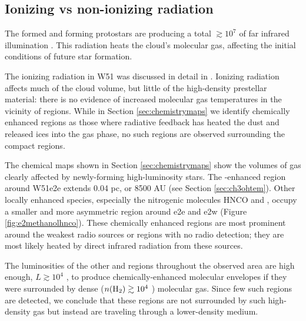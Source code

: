 \documentclass{emulateapj}
\begin{document}
\subsection{Ionizing vs non-ionizing radiation}
\label{sec:nonionizingradiation}
The formed and forming protostars are producing a total $\gtrsim10^7$ \lsun of
far infrared illumination \citep{Ginsburg2016b}.  This radiation heats the
cloud's molecular gas, affecting the initial conditions of future star
formation.

The ionizing radiation in W51 was discussed in detail in \citet{Ginsburg2016b}.
Ionizing radiation affects much of the cloud volume, but little of the
high-density prestellar material:  there is no evidence of increased molecular gas
temperatures in the vicinity of \hii regions.  While in Section
\ref{sec:chemistrymaps} we identify chemically enhanced regions as those where
radiative feedback has heated the dust and released ices into the gas phase, no
such regions are observed surrounding the compact \hii regions.


The chemical maps shown in Section \ref{sec:chemistrymaps} show the volumes of
gas clearly affected by newly-forming high-luminosity stars.  The
\methanol-enhanced region around W51e2e extends 0.04 pc, or 8500 AU (see Section
\ref{sec:ch3ohtem}). Other locally enhanced species, especially the nitrogenic
molecules HNCO and \formamide, occupy a smaller and more asymmetric region
around e2e and e2w (Figure \ref{fig:e2methanolhnco}).  These chemically enhanced
regions are most prominent around the weakest radio sources or regions with
no radio detection; they are most likely heated by direct infrared radiation
from these sources.

The luminosities of the other \uchii and \hchii regions throughout the observed
area are high enough, $L\gtrsim10^4$ \lsun, to produce chemically-enhanced
molecular envelopes if they were surrounded by dense ($n(\textrm{H}_{2})\gtrsim10^4$
\percc) molecular gas.  Since few such regions are detected, we conclude that
these \hii regions are not surrounded by such high-density gas but instead are
traveling through a lower-density medium.
\end{document}
